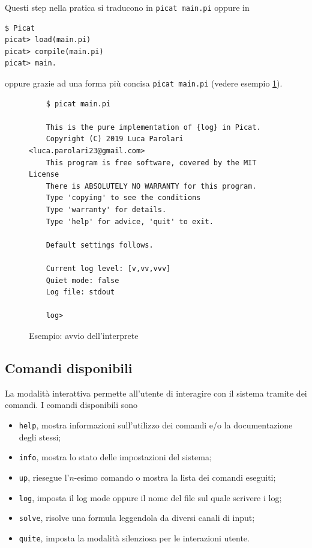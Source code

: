 \documentclass[12pt,a4paper,openright]{book}  %
\begin{document}
Questi step nella pratica si traducono in \texttt{picat main.pi}
oppure in
\begin{verbatim}
$ Picat
picat> load(main.pi)
picat> compile(main.pi)
picat> main.
\end{verbatim}
oppure grazie ad una forma più concisa \texttt{picat main.pi} (vedere
esempio \ref{fig:example_interpreterstart}).

\begin{figure}
	\begin{verbatim}
	$ picat main.pi

	This is the pure implementation of {log} in Picat.
	Copyright (C) 2019 Luca Parolari <luca.parolari23@gmail.com>
	This program is free software, covered by the MIT License
	There is ABSOLUTELY NO WARRANTY for this program.
	Type 'copying' to see the conditions
	Type 'warranty' for details.
	Type 'help' for advice, 'quit' to exit.

	Default settings follows.

	Current log level: [v,vv,vvv]
	Quiet mode: false
	Log file: stdout

	log>
	\end{verbatim}
	\caption{Esempio: avvio dell'interprete}
	\label{fig:example_interpreterstart}
\end{figure}

\subsection{Comandi disponibili}

La modalità interattiva permette all'utente di interagire con il
sistema tramite dei comandi. I comandi disponibili sono
\begin{itemize}
	\item \texttt{help}, mostra informazioni sull'utilizzo dei
          comandi e/o la documentazione degli stessi;
	\item \texttt{info}, mostra lo stato delle impostazioni del
          sistema;
	\item \texttt{up}, riesegue l'$n$-esimo comando o mostra la
          lista dei comandi eseguiti;
	\item \texttt{log}, imposta il log mode oppure il nome del
          file sul quale scrivere i log;
	\item \texttt{solve}, risolve una formula leggendola da
          diversi canali di input;
	\item \texttt{quite}, imposta la modalità silenziosa per le
          interazioni utente.
\end{itemize}
\end{document}
